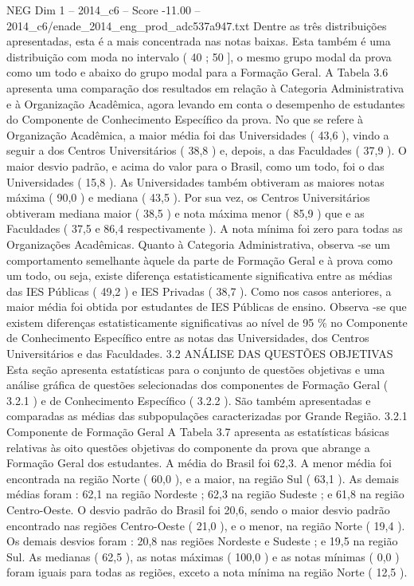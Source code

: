 \begin{textsample}{NEG Dim 1 – 2014\_c6 – Score -11.00 – 2014\_c6/enade\_2014\_eng\_prod\_adc537a947.txt}
Dentre as três distribuições apresentadas, esta é a mais concentrada nas notas baixas.
Esta também é uma distribuição com moda no intervalo ( 40 ; 50 ], o mesmo grupo modal da prova como um todo e abaixo do grupo modal para a Formação Geral.
A Tabela 3.6 apresenta uma comparação dos resultados em relação à Categoria Administrativa e à Organização Acadêmica, agora levando em conta o desempenho de estudantes do Componente de Conhecimento Específico da prova.
No que se refere à Organização Acadêmica, a maior média foi das Universidades ( 43,6 ), vindo a seguir a dos Centros Universitários ( 38,8 ) e, depois, a das Faculdades ( 37,9 ).
O maior desvio padrão, e acima do valor para o Brasil, como um todo, foi o das Universidades ( 15,8 ).
As Universidades também obtiveram as maiores notas máxima ( 90,0 ) e mediana ( 43,5 ).
Por sua vez, os Centros Universitários obtiveram mediana maior ( 38,5 ) e nota máxima menor ( 85,9 ) que e as Faculdades ( 37,5 e 86,4 respectivamente ).
A nota mínima foi zero para todas as Organizações Acadêmicas.
Quanto à Categoria Administrativa, observa -se um comportamento semelhante àquele da parte de Formação Geral e à prova como um todo, ou seja, existe diferença estatisticamente significativa entre as médias das IES Públicas ( 49,2 ) e IES Privadas ( 38,7 ).
Como nos casos anteriores, a maior média foi obtida por estudantes de IES Públicas de ensino.
Observa -se que existem diferenças estatisticamente significativas ao nível de 95 \% no Componente de Conhecimento Específico entre as notas das Universidades, dos Centros Universitários e das Faculdades. 3.2 ANÁLISE DAS QUESTÕES OBJETIVAS Esta seção apresenta estatísticas para o conjunto de questões objetivas e uma análise gráfica de questões selecionadas dos componentes de Formação Geral ( 3.2.1 ) e de Conhecimento Específico ( 3.2.2 ).
São também apresentadas e comparadas as médias das subpopulações caracterizadas por Grande Região. 3.2.1 Componente de Formação Geral A Tabela 3.7 apresenta as estatísticas básicas relativas às oito questões objetivas do componente da prova que abrange a Formação Geral dos estudantes.
A média do Brasil foi 62,3.
A menor média foi encontrada na região Norte ( 60,0 ), e a maior, na região Sul ( 63,1 ).
As demais médias foram : 62,1 na região Nordeste ; 62,3 na região Sudeste ; e 61,8 na região Centro-Oeste.
O desvio padrão do Brasil foi 20,6, sendo o maior desvio padrão encontrado nas regiões Centro-Oeste ( 21,0 ), e o menor, na região Norte ( 19,4 ).
Os demais desvios foram : 20,8 nas regiões Nordeste e Sudeste ; e 19,5 na região Sul.
As medianas ( 62,5 ), as notas máximas ( 100,0 ) e as notas mínimas ( 0,0 ) foram iguais para todas as regiões, exceto a nota mínima na região Norte ( 12,5 ).

\end{textsample}
